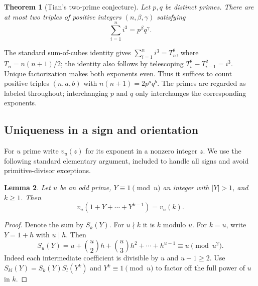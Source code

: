 \documentclass[11pt,a4paper]{article}
\newtheorem{SourceRbgMtheorem}{Theorem}
\newtheorem{SourceRbgMlemma}[SourceRbgMtheorem]{Lemma}
\begin{document}
\begin{SourceRbgMtheorem}[Tian's two-prime conjecture]\label{R16M:thm:main}
Let $p,q$ be distinct primes. There are at most two triples of
positive integers $(n,\beta,\gamma)$ satisfying
\[
                     \sum_{i=1}^{n}i^3=p^\beta q^\gamma .
\]
\end{SourceRbgMtheorem}

The standard sum-of-cubes identity gives
$\sum_{i=1}^{n}i^3=T_n^2$, where $T_n=n(n+1)/2$;
the identity also follows by telescoping
$T_i^2-T_{i-1}^2=i^3$. Unique factorization makes both exponents
even. Thus it suffices to count positive triples $(n,a,b)$
with $n(n+1)=2p^a q^b$. The primes are regarded as labeled
throughout; interchanging $p$ and $q$ only interchanges the
corresponding exponents.

\subsection{Uniqueness in a sign and orientation}
For $u$ prime write $v_u(z)$ for its exponent in a nonzero
integer $z$. We use the following standard elementary argument,
included to handle all signs and avoid primitive-divisor
exceptions.

\begin{SourceRbgMlemma}\label{R16M:lem:valuation}
Let $u$ be an odd prime, $Y\equiv1\pmod u$ an integer with
$|Y|>1$, and $k\ge1$. Then
\[
            v_u(1+Y+\cdots+Y^{k-1})=v_u(k).
\]
\end{SourceRbgMlemma}
\begin{proof}
Denote the sum by $S_k(Y)$. For $u\nmid k$ it is $k$ modulo $u$.
For $k=u$, write $Y=1+h$ with $u\mid h$. Then
\[
 S_u(Y)=u+\binom{u}{2}h+\binom{u}{3}h^2+\cdots+h^{u-1}
             \equiv u\pmod{u^2}.
\]
Indeed each intermediate coefficient is divisible by $u$ and
$u-1\ge2$. Use
$S_{kl}(Y)=S_k(Y)S_l(Y^k)$ and $Y^k\equiv1\pmod u$ to factor
off the full power of $u$ in $k$.
\end{proof}
\end{document}
